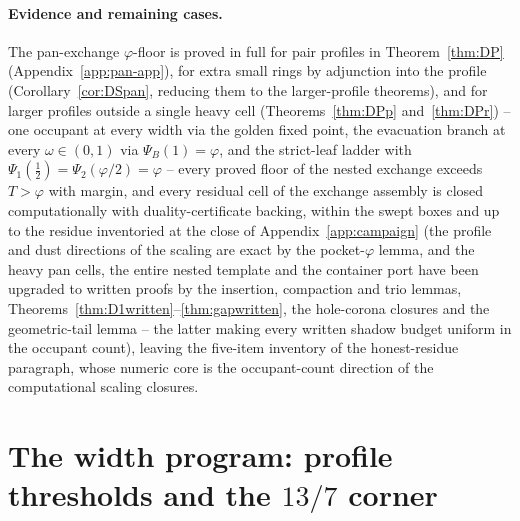 \documentclass[11pt]{article}
\theoremstyle{definition}
\begin{document}
\paragraph{Evidence and remaining cases.} The pan-exchange
$\varphi$-floor is proved in full for pair profiles in
Theorem~\ref{thm:DP} (Appendix~\ref{app:pan-app}), for extra small
rings by adjunction into the profile (Corollary~\ref{cor:DSpan},
reducing them to the larger-profile theorems), and for larger
profiles outside a single heavy cell
(Theorems~\ref{thm:DPp} and~\ref{thm:DPr}) -- one occupant at every
width via the golden fixed point, the evacuation branch at every
$\omega\in(0,1)$
via $\Psi_B(1)=\varphi$, and the strict-leaf ladder with
$\Psi_1(\tfrac12)=\Psi_2(\varphi/2)=\varphi$ -- every proved floor
of the nested exchange exceeds $T>\varphi$ with margin, and every
residual cell of the exchange assembly is closed computationally
with duality-certificate backing, within the swept boxes and up to
the residue inventoried at the close of
Appendix~\ref{app:campaign} (the
profile and dust directions of the scaling are exact by the
pocket-$\varphi$ lemma, and the heavy pan cells, the entire nested
template and the container port have been upgraded to written
proofs by the insertion, compaction and trio lemmas,
Theorems~\ref{thm:D1written}--\ref{thm:gapwritten}, the
hole-corona closures and the geometric-tail lemma -- the latter
making every written shadow budget uniform in the occupant count),
leaving the five-item inventory of the honest-residue paragraph,
whose numeric core is the occupant-count direction of the
computational scaling closures.

\section{The width program: profile thresholds and the \texorpdfstring{$13/7$}{13/7} corner}
\label{sec:width}
\end{document}
